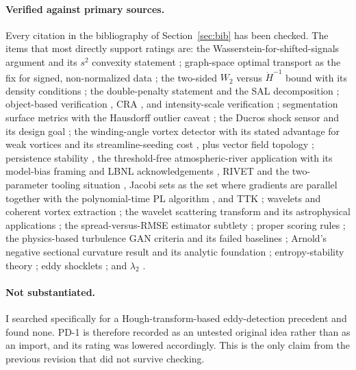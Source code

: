 \documentclass[11pt]{article}
\begin{document}
\paragraph{Verified against primary sources.}
Every citation in the bibliography of Section~\ref{sec:bib} has been checked. The items that
most directly support ratings are: the Wasserstein-for-shifted-signals argument and its
$s^2$ convexity statement \cite{engquist2014,engquistyang,yang2016}; graph-space optimal
transport as the fix for signed, non-normalized data
\cite{metivier2016gji,metivier2018geophysics,metivier2018eage,metivier2019ip}; the two-sided
$W_2$ versus $\dot H^{-1}$ bound with its density conditions \cite{peyre2018}; the
double-penalty statement and the SAL decomposition \cite{wernli2008}; object-based
verification \cite{davis2006a,davis2006b,davis2009}, CRA \cite{ebertmcbride2000}, and
intensity-scale verification \cite{casati2004}; segmentation surface metrics with the
Hausdorff outlier caveat \cite{taha2015}; the Ducros shock sensor and its design goal
\cite{ducros1999}; the winding-angle vortex detector with its stated advantage for weak
vortices and its streamline-seeding cost \cite{sadarjoen2000,sadarjoen1999}, plus vector
field topology \cite{helman1989,helman1991,laramee2007}; persistence stability
\cite{cohensteiner2007}, the threshold-free atmospheric-river application with its
model-bias framing and LBNL acknowledgements \cite{muszynski2019}, RIVET and the
two-parameter tooling situation \cite{lesnickwright2015,lesnickwright2022}, Jacobi sets as
the set where gradients are parallel together with the polynomial-time PL algorithm
\cite{edelsbrunnerharer2004}, and TTK \cite{tierny2018}; wavelets and coherent vortex
extraction \cite{farge1992,fargeschneider1999,farge2001,schneidervasilyev2010}; the wavelet
scattering transform and its astrophysical applications
\cite{mallat2012,brunamallat2013,allys2019,regaldo2020,saydjari2021}; the spread-versus-RMSE
estimator subtlety \cite{fortin2014}; proper scoring rules \cite{gneitingraftery2007}; the
physics-based turbulence GAN criteria and its failed baselines \cite{granero2024}; Arnold's
negative sectional curvature result and its analytic foundation
\cite{arnold1966,ebinmarsden1970,arnoldkhesin1998}; entropy-stability theory
\cite{tadmor1987,tadmor2003,ismailroe2009}; eddy shocklets \cite{lee1991}; and $\lambda_2$
\cite{jeonghussain1995}.

\paragraph{Not substantiated.}
I searched specifically for a Hough-transform-based eddy-detection precedent and found none.
PD-1 is therefore recorded as an untested original idea rather than as an import, and its
rating was lowered accordingly. This is the only claim from the previous revision that did
not survive checking.
\end{document}
